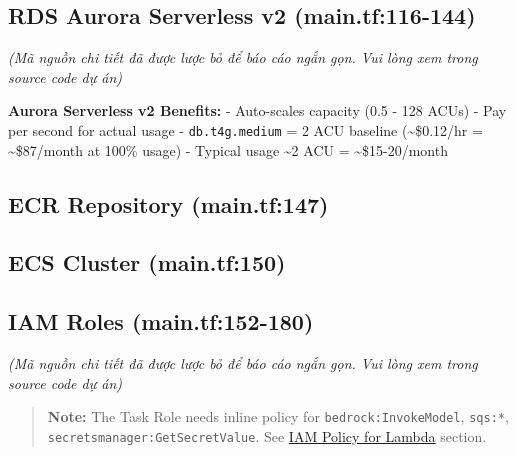 \hypertarget{rds-aurora-serverless-v2-main.tf116-144}{%
\subsection{RDS Aurora Serverless v2
(main.tf:116-144)}}

\emph{(Mã nguồn chi tiết đã được lược bỏ để báo cáo ngắn gọn. Vui lòng
xem trong source code dự án)}

\textbf{Aurora Serverless v2 Benefits:} - Auto-scales capacity (0.5 -
128 ACUs) - Pay per second for actual usage - \texttt{db.t4g.medium} = 2
ACU baseline (\textasciitilde\$0.12/hr = \textasciitilde\$87/month at
100\% usage) - Typical usage \textasciitilde2 ACU =
\textasciitilde\$15-20/month

\hypertarget{ecr-repository-main.tf147}{%
\subsection{ECR Repository
(main.tf:147)}}

\begin{Shaded}
\begin{Highlighting}[]
\NormalTok{\}}
\end{Highlighting}
\end{Shaded}

\hypertarget{ecs-cluster-main.tf150}{%
\subsection{ECS Cluster (main.tf:150)}}

\begin{Shaded}
\begin{Highlighting}[]
\NormalTok{\}}
\end{Highlighting}
\end{Shaded}

\hypertarget{iam-roles-main.tf152-180}{%
\subsection{IAM Roles
(main.tf:152-180)}}

\emph{(Mã nguồn chi tiết đã được lược bỏ để báo cáo ngắn gọn. Vui lòng
xem trong source code dự án)}

\begin{quote}
\textbf{Note:} The Task Role needs inline policy for
\texttt{bedrock:InvokeModel}, \texttt{sqs:*},
\texttt{secretsmanager:GetSecretValue}. See
\href{5.12-Lambda-ETL/\#iam-policy-for-lambda}{IAM Policy for Lambda}
section.
\end{quote}

